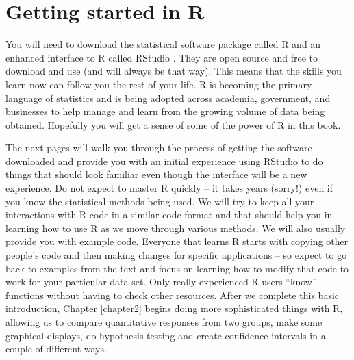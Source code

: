 \documentclass[]{book}
\renewcommand{\indent}{\hspace{15pt}}
\begin{document}
\hypertarget{section1-2}{%
\section{Getting started in R}\label{section1-2}}

You will need to download the statistical software package called R and an enhanced interface to R called
RStudio \citep{RStudio}. They are open source and free to download and use
(and will always be that way). This means that the skills you learn now can
follow you the rest of your life. R is becoming the primary language of
statistics and is being adopted across academia, government, and businesses to
help manage and learn from the growing volume of data being obtained. Hopefully
you will get a sense of some of the power of R in this book.

\indent The next pages will walk you through the process of getting the software downloaded and provide you with
an initial experience using RStudio to do things that should look familiar
even though the interface will be a new experience. Do not expect to master R
quickly -- it takes years (sorry!) even if you know the statistical methods
being used. We will try to keep all your interactions with R code in a similar
code format and that should help you in learning how to use R as we move
through various methods. We will also usually provide you with example code. Everyone
that learns R starts with copying other people's code and then making changes
for specific applications -- so expect to go back to examples from the text and focus
on learning how to modify that code to work for your particular data set. Only
really experienced R users ``know'' functions without having to check other
resources. After we complete this basic introduction, Chapter \ref{chapter2} begins doing
more sophisticated things with R, allowing us to compare quantitative responses
from two groups, make some graphical displays, do hypothesis testing  and create
confidence intervals in a couple of different ways.
\end{document}
